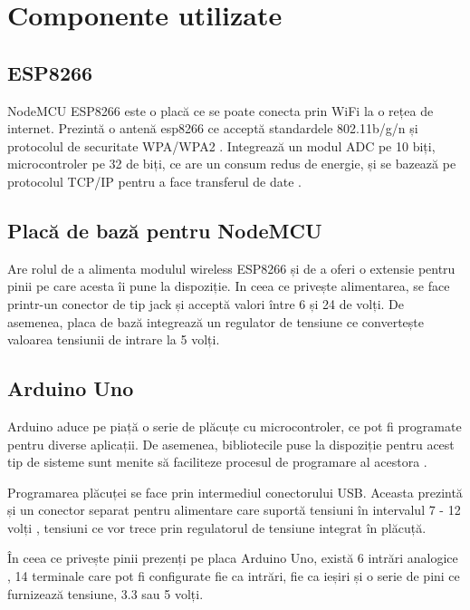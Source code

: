 \section{Componente utilizate}

\subsection{ESP8266}

	NodeMCU ESP8266 este o placă ce se poate conecta prin WiFi la o rețea de internet. Prezintă o antenă esp8266 ce acceptă standardele 802.11b/g/n și protocolul de securitate WPA/WPA2 \cite{esp8266}. Integrează un modul ADC pe 10 biți, microcontroler pe 32 de biți, ce are un consum redus de energie, și se bazează pe protocolul TCP/IP pentru a face transferul de date \cite{esp8266}.

\subsection{Placă de bază pentru NodeMCU}

	Are rolul de a alimenta modulul wireless ESP8266 și de a oferi o extensie pentru pinii pe care acesta îi pune la dispoziție. In ceea ce privește alimentarea, se face printr-un conector de tip jack și acceptă valori între 6 și 24 de volți. De asemenea, placa de bază integrează un regulator de tensiune ce convertește valoarea tensiunii de intrare la 5 volți.

\subsection{Arduino Uno}

	Arduino aduce pe piață o serie de plăcuțe cu microcontroler, ce pot fi programate pentru diverse aplicații. De asemenea, bibliotecile puse la dispoziție pentru acest tip de sisteme sunt menite să faciliteze procesul de programare al acestora \cite{arduino}.

	Programarea plăcuței se face prin intermediul conectorului USB. Aceasta prezintă și un conector separat pentru alimentare care suportă tensiuni în intervalul 7 - 12 volți \cite{arduino}, tensiuni ce vor trece prin regulatorul de tensiune integrat în plăcuță.

	În ceea ce privește pinii prezenți pe placa Arduino Uno, există 6 intrări analogice \cite{arduino}, 14 terminale care pot fi configurate fie ca intrări, fie ca ieșiri \cite{arduino} și o serie de pini ce furnizează tensiune, 3.3 sau 5 volți.


